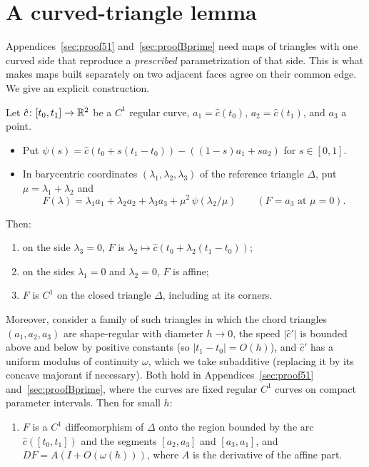 \section{A curved-triangle lemma}\label{sec:curvedtri}

Appendices~\ref{sec:proof51} and~\ref{sec:proofBprime} need maps of triangles with one curved side that reproduce a
\emph{prescribed} parametrization of that side. This is what makes maps built separately on two adjacent faces agree
on their common edge. We give an explicit construction.

\begin{lemma}\label{lem:curvedtri}
Let $\hat c\colon[t_0,t_1]\to\mathbb{R}^2$ be a $C^1$ regular curve, $a_1=\hat c(t_0)$, $a_2=\hat c(t_1)$, and $a_3$ a point.
\begin{itemize}
\item Put $\psi(s)=\hat c(t_0+s(t_1-t_0))-((1-s)a_1+sa_2)$ for $s\in[0,1]$.
\item In barycentric coordinates $(\lambda_1,\lambda_2,\lambda_3)$ of the reference triangle $\Delta$, put
$\mu=\lambda_1+\lambda_2$ and
\[
F(\lambda)=\lambda_1a_1+\lambda_2a_2+\lambda_3a_3+\mu^2\,\psi(\lambda_2/\mu)\qquad(F=a_3\text{ at }\mu=0).
\]
\end{itemize}
Then:
\begin{enumerate}
\item[(a)] on the side $\lambda_3=0$, $F$ is $\lambda_2\mapsto\hat c(t_0+\lambda_2(t_1-t_0))$;
\item[(b)] on the sides $\lambda_1=0$ and $\lambda_2=0$, $F$ is affine;
\item[(c)] $F$ is $C^1$ on the closed triangle $\Delta$, including at its corners.
\end{enumerate}
Moreover, consider a family of such triangles in which the chord triangles $(a_1,a_2,a_3)$ are shape-regular with
diameter $h\to0$, the speed $|\hat c'|$ is bounded above and below by positive constants (so $|t_1-t_0|=O(h)$), and
$\hat c'$ has a uniform modulus of continuity $\omega$, which we take subadditive (replacing it by its concave majorant
if necessary). Both hold in Appendices~\ref{sec:proof51} and~\ref{sec:proofBprime}, where the curves are fixed regular
$C^1$ curves on compact parameter intervals. Then for small $h$:
\begin{enumerate}
\item[(d)] $F$ is a $C^1$ diffeomorphism of $\Delta$ onto the region bounded by the arc $\hat c([t_0,t_1])$ and the
segments $[a_2,a_3]$ and $[a_3,a_1]$, and $DF=A(I+O(\omega(h)))$, where $A$ is the derivative of the affine part.
\end{enumerate}
\end{lemma}

